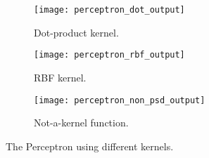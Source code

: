 \begin{answer}
	\begin{figure}[H]
	\centering
	\begin{subfigure}[H]{0.33\linewidth}
		\texttt{[image: perceptron\_dot\_output]}
		\caption{Dot-product kernel.}
	\end{subfigure}
	\begin{subfigure}[H]{0.33\linewidth}
		\texttt{[image: perceptron\_rbf\_output]}
		\caption{RBF kernel.}
	\end{subfigure}
	\begin{subfigure}[H]{0.33\linewidth}
		\texttt{[image: perceptron\_non\_psd\_output]}
		\caption{Not-a-kernel function.}
	\end{subfigure}
	\caption{The Perceptron using different kernels.}
	\end{figure}
\end{answer}
